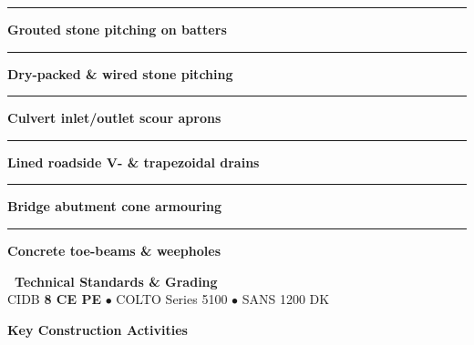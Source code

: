 \documentclass[a4paper,11pt]{article}
\providecommand{\faMountain}{\faLayerGroup}
\begin{document}
\begin{minipage}[t]{0.34\textwidth}
    \vspace{0pt}
    \begin{tcolorbox}[
        enhanced, colback=mhoffwhite, colframe=mhnavy, boxrule=0.9pt, arc=4pt,
        title={\bfseries\color{white}\faMountain\ Scope of Work},
        colbacktitle=mhnavy, left=7pt, right=7pt, top=5pt, bottom=5pt, drop shadow=black!5
    ]
        \fontsize{7.8pt}{10.8pt}\selectfont
        \textcolor{mhnavy}{\rule{3.5pt}{3.5pt}}\hspace{4pt}\textbf{Grouted stone pitching on batters}\\
        \textcolor{mhnavy}{\rule{3.5pt}{3.5pt}}\hspace{4pt}\textbf{Dry-packed \& wired stone pitching}\\
        \textcolor{mhnavy}{\rule{3.5pt}{3.5pt}}\hspace{4pt}\textbf{Culvert inlet/outlet scour aprons}\\
        \textcolor{mhnavy}{\rule{3.5pt}{3.5pt}}\hspace{4pt}\textbf{Lined roadside V- \& trapezoidal drains}\\
        \textcolor{mhnavy}{\rule{3.5pt}{3.5pt}}\hspace{4pt}\textbf{Bridge abutment cone armouring}\\
        \textcolor{mhnavy}{\rule{3.5pt}{3.5pt}}\hspace{4pt}\textbf{Concrete toe-beams \& weepholes}
    \end{tcolorbox}

    \vspace{0.12cm}

    \begin{tcolorbox}[
        enhanced, colback=white, colframe=mhlightgray, boxrule=0.8pt, arc=4pt,
        left=6pt, right=6pt, top=5pt, bottom=5pt, drop shadow=black!3
    ]
        {\fontsize{7.5pt}{9.6pt}\selectfont\bfseries\color{mhnavy}\faCheckDouble\ Technical Standards \& Grading}\\[2pt]
        {\fontsize{7.3pt}{9.4pt}\selectfont\color{mhtextmuted}
        CIDB \textbf{8 CE PE} $\bullet$ COLTO Series 5100 $\bullet$ SANS 1200 DK}
    \end{tcolorbox}
\end{minipage}

\vfill

{\large\bfseries\color{mhnavy} Key Construction Activities}
\vspace{0.10cm}
\end{document}
